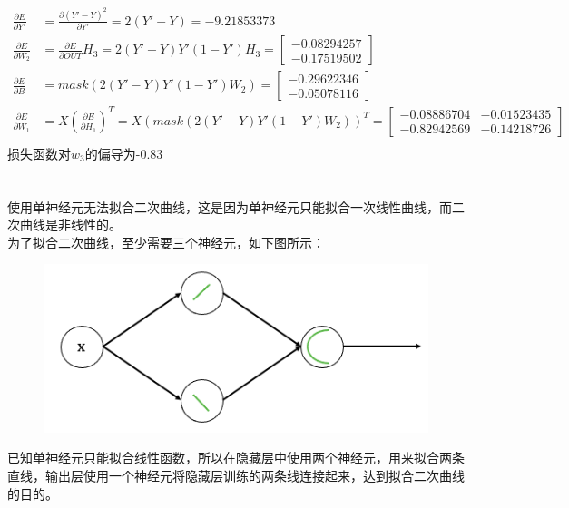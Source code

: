 \documentclass{article}
\begin{document}
\begin{equation}
	\begin{aligned}
		\frac{\partial{E}}{\partial{Y'}}&=\frac{\partial{(Y'-Y)^2}}{\partial{Y'}}=2(Y'-Y)=-9.21853373\\
		\frac{\partial{E}}{\partial{W_2}}&=	\frac{\partial{E}}{\partial{OUT}}H_3=2(Y'-Y)Y'(1-Y')H_3=\begin{bmatrix}-0.08294257\\ -0.17519502\end{bmatrix}\\
		\frac{\partial{E}}{\partial{B}}&=mask(2(Y'-Y)Y'(1-Y')W_2)=\begin{bmatrix}-0.29622346\\ -0.05078116\end{bmatrix}\\
		\frac{\partial{E}}{\partial{W_1}}&=X(\frac{\partial{E}}{\partial{H_1}})^T=X(mask(2(Y'-Y)Y'(1-Y')W_2))^T=\begin{bmatrix}-0.08886704 & -0.01523435\\-0.82942569 & -0.14218726\end{bmatrix}\\
	\end{aligned}
\end{equation}
损失函数对$w_3$的偏导为-0.83

\section{}
使用单神经元无法拟合二次曲线，这是因为单神经元只能拟合一次线性曲线，而二次曲线是非线性的。\\
为了拟合二次曲线，至少需要三个神经元，如下图所示：
\begin{figure}[H]
	\centering
	\includegraphics[scale=0.7]{neural.png}
\end{figure}
已知单神经元只能拟合线性函数，所以在隐藏层中使用两个神经元，用来拟合两条直线，输出层使用一个神经元将隐藏层训练的两条线连接起来，达到拟合二次曲线的目的。
\end{document}
